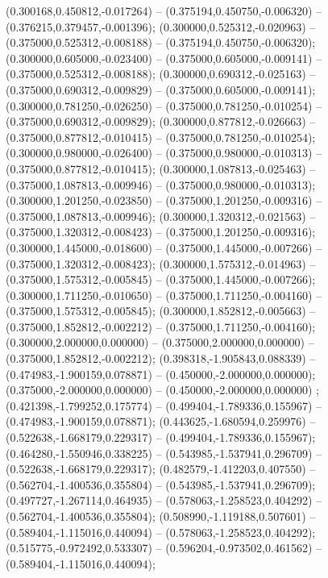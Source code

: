  (0.300168,0.450812,-0.017264) -- (0.375194,0.450750,-0.006320) -- (0.376215,0.379457,-0.001396);
 (0.300000,0.525312,-0.020963) -- (0.375000,0.525312,-0.008188) -- (0.375194,0.450750,-0.006320);
 (0.300000,0.605000,-0.023400) -- (0.375000,0.605000,-0.009141) -- (0.375000,0.525312,-0.008188);
 (0.300000,0.690312,-0.025163) -- (0.375000,0.690312,-0.009829) -- (0.375000,0.605000,-0.009141);
 (0.300000,0.781250,-0.026250) -- (0.375000,0.781250,-0.010254) -- (0.375000,0.690312,-0.009829);
 (0.300000,0.877812,-0.026663) -- (0.375000,0.877812,-0.010415) -- (0.375000,0.781250,-0.010254);
 (0.300000,0.980000,-0.026400) -- (0.375000,0.980000,-0.010313) -- (0.375000,0.877812,-0.010415);
 (0.300000,1.087813,-0.025463) -- (0.375000,1.087813,-0.009946) -- (0.375000,0.980000,-0.010313);
 (0.300000,1.201250,-0.023850) -- (0.375000,1.201250,-0.009316) -- (0.375000,1.087813,-0.009946);
 (0.300000,1.320312,-0.021563) -- (0.375000,1.320312,-0.008423) -- (0.375000,1.201250,-0.009316);
 (0.300000,1.445000,-0.018600) -- (0.375000,1.445000,-0.007266) -- (0.375000,1.320312,-0.008423);
 (0.300000,1.575312,-0.014963) -- (0.375000,1.575312,-0.005845) -- (0.375000,1.445000,-0.007266);
 (0.300000,1.711250,-0.010650) -- (0.375000,1.711250,-0.004160) -- (0.375000,1.575312,-0.005845);
 (0.300000,1.852812,-0.005663) -- (0.375000,1.852812,-0.002212) -- (0.375000,1.711250,-0.004160);
 (0.300000,2.000000,0.000000) -- (0.375000,2.000000,0.000000) -- (0.375000,1.852812,-0.002212);
 (0.398318,-1.905843,0.088339) -- (0.474983,-1.900159,0.078871) -- (0.450000,-2.000000,0.000000);
 (0.375000,-2.000000,0.000000) -- (0.450000,-2.000000,0.000000) ;
 (0.421398,-1.799252,0.175774) -- (0.499404,-1.789336,0.155967) -- (0.474983,-1.900159,0.078871);
 (0.443625,-1.680594,0.259976) -- (0.522638,-1.668179,0.229317) -- (0.499404,-1.789336,0.155967);
 (0.464280,-1.550946,0.338225) -- (0.543985,-1.537941,0.296709) -- (0.522638,-1.668179,0.229317);
 (0.482579,-1.412203,0.407550) -- (0.562704,-1.400536,0.355804) -- (0.543985,-1.537941,0.296709);
 (0.497727,-1.267114,0.464935) -- (0.578063,-1.258523,0.404292) -- (0.562704,-1.400536,0.355804);
 (0.508990,-1.119188,0.507601) -- (0.589404,-1.115016,0.440094) -- (0.578063,-1.258523,0.404292);
 (0.515775,-0.972492,0.533307) -- (0.596204,-0.973502,0.461562) -- (0.589404,-1.115016,0.440094);
